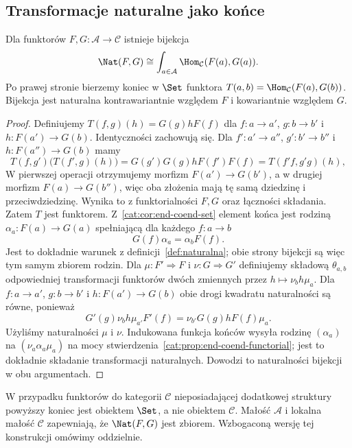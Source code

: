 \subsection{Transformacje naturalne jako końce}
\begin{twierdzenie}\label{cat:thm:nat-as-end}
Dla funktorów $F,G:\mathcal A\to\mathcal C$ istnieje bijekcja
\[
 \Nat(F,G)\cong\int_{a\in\mathcal A}\Hom_{\mathcal C}(F(a),G(a)).
\]
Po prawej stronie bierzemy koniec w $\Set$ funktora $T(a,b)=\Hom_{\mathcal C}(F(a),G(b))$. Bijekcja jest naturalna kontrawariantnie względem $F$ i kowariantnie względem $G$.
\end{twierdzenie}
\begin{proof}
Definiujemy $T(f,g)(h)=G(g)hF(f)$ dla $f:a\to a'$, $g:b\to b'$ i $h:F(a')\to G(b)$. Identyczności zachowują się. Dla $f':a'\to a''$, $g':b'\to b''$ i $h:F(a'')\to G(b)$ mamy
\[
 T(f,g')\bigl(T(f',g)(h)\bigr)
 =G(g')G(g)hF(f')F(f)
 =T(f'f,g'g)(h),
\]
W pierwszej operacji otrzymujemy morfizm $F(a')\to G(b')$, a w drugiej morfizm $F(a)\to G(b'')$, więc oba złożenia mają tę samą dziedzinę i przeciwdziedzinę. Wynika to z funktorialności $F,G$ oraz łączności składania. Zatem $T$ jest funktorem. Z~\ref{cat:cor:end-coend-set} element końca jest rodziną $\alpha_a:F(a)\to G(a)$ spełniającą dla każdego $f:a\to b$
\[
 G(f)\alpha_a=\alpha_bF(f).
\]
Jest to dokładnie warunek z definicji~\ref{def:naturalna}; obie strony bijekcji są więc tym samym zbiorem rodzin. Dla $\mu:F'\Rightarrow F$ i $\nu:G\Rightarrow G'$ definiujemy składową $\theta_{a,b}$ odpowiedniej transformacji funktorów dwóch zmiennych przez $h\mapsto\nu_b h\mu_a$. Dla $f:a\to a'$, $g:b\to b'$ i $h:F(a')\to G(b)$ obie drogi kwadratu naturalności są równe, ponieważ
\[
 G'(g)\nu_b h\mu_{a'}F'(f)
 =\nu_{b'}G(g)hF(f)\mu_a.
\]
Użyliśmy naturalności $\mu$ i $\nu$. Indukowana funkcja końców wysyła rodzinę $(\alpha_a)$ na $(\nu_a\alpha_a\mu_a)$ na mocy stwierdzenia~\ref{cat:prop:end-coend-functorial}; jest to dokładnie składanie transformacji naturalnych. Dowodzi to naturalności bijekcji w obu argumentach.
\end{proof}
\begin{uwaga}
W przypadku funktorów do kategorii $\mathcal C$ nieposiadającej dodatkowej struktury powyższy koniec jest obiektem $\Set$, a nie obiektem $\mathcal C$. Małość $\mathcal A$ i lokalna małość $\mathcal C$ zapewniają, że $\Nat(F,G)$ jest zbiorem. Wzbogaconą wersję tej konstrukcji omówimy oddzielnie.
\end{uwaga}

